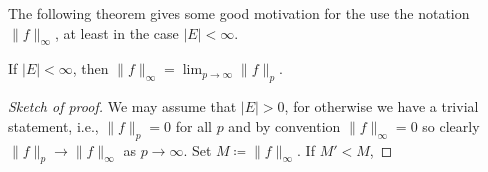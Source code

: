 The following theorem gives some good motivation for the use the notation
$\|f\|_\infty$, at least in the case $|E|<\infty$.
\begin{theorem}[8.1]
If $|E|<\infty$, then $\|f\|_\infty=\lim_{p\to\infty}\|f\|_p$.
\end{theorem}
\begin{proof}[Sketch of proof]
We may assume that $|E|>0$, for otherwise we have a trivial statement,
i.e., $\|f\|_p=0$ for all $p$ and by convention $\|f\|_\infty=0$ so clearly
$\|f\|_p\to\|f\|_\infty$ as $p\to\infty$. Set $M\coloneqq\|f\|_\infty$. If $M'<M$,
\end{proof}


